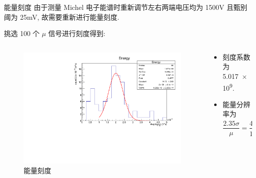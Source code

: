 \documentclass[10pt]{beamer}
\begin{document}
\begin{frame}[label={sec:org527b8a9}]{能量刻度}
由于测量 Michel 电子能谱时重新调节左右两端电压均为 1500V 且甄别阈为 25mV, 故需要重新进行能量刻度.

挑选 100 个 \(\mu\) 信号进行刻度得到:

\begin{columns}
\begin{column}{0.5\columnwidth}
\begin{figure}[htbp]
\centering
\includegraphics[width=1.0\textwidth]{../../DetectorPerform/ECali/reqqdist.pdf}
\caption{能量刻度}
\end{figure}
\end{column}

\begin{column}{0.5\columnwidth}
\begin{itemize}
\item 刻度系数为 \num{5.017e9}.
\item 能量分辨率为
\begin{equation*}
\frac{2.35\sigma}{\mu} = \frac{\num{4.305e-10}}{\num{1.987e-09}} = 21.7\%.
\end{equation*}
\end{itemize}
\end{column}
\end{columns}
\end{frame}
\end{document}
